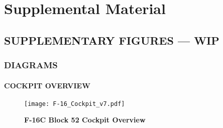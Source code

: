 \part{Supplemental Material}

\appendix
\chapter{SUPPLEMENTARY FIGURES --- WIP}
\localtableofcontents
\cleardoublepage


\section{DIAGRAMS}

\subsection{COCKPIT OVERVIEW}
\begin{figure}[h]
    \centering
    \texttt{[image: F-16\_Cockpit\_v7.pdf]}
    \caption{\textbf{F-16C Block 52 Cockpit Overview}}
    \label{fig:cockpitoverview}
\end{figure}

\cleardoublepage